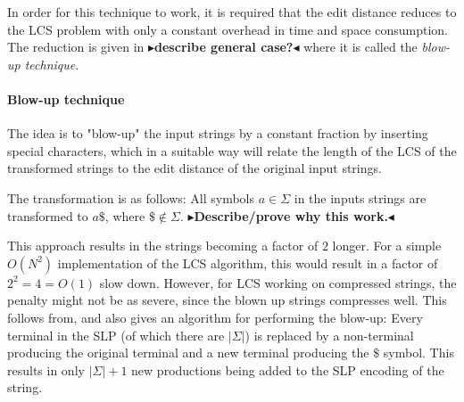 \documentclass[twoside,11pt,openright]{report}
\newcommand{\todo}[1]{{\color[rgb]{.5,0,0}\textbf{$\blacktriangleright$#1$\blacktriangleleft$}}}
\begin{document}
In order for this technique to work, it is required that the edit distance reduces to the LCS problem with only a constant overhead in time and space consumption. The reduction is given in \cite{DBLP:journals/corr/abs-0707-3619} \todo{describe general case?} where it is called the \textit{blow-up technique}.

\paragraph{Blow-up technique}
The idea is to "blow-up" the input strings by a constant fraction by inserting special characters, which in a suitable way will relate the length of the LCS of the transformed strings to the edit distance of the original input strings.

The transformation is as follows: All symbols $a \in \Sigma$ in the inputs strings are transformed to $a\$$, where $\$ \not\in \Sigma$. \todo{Describe/prove why this work.}

This approach results in the strings becoming a factor of $2$ longer. For a simple $O(N^2)$ implementation of the LCS algorithm, this would result in a factor of $2^2 = 4 = O(1)$ slow down. However, for LCS working on compressed strings, the penalty might not be as severe, since the blown up strings compresses well. This follows from, and also gives an algorithm for performing the blow-up: Every terminal in the SLP (of which there are $|\Sigma|$) is replaced by a non-terminal producing the original terminal and a new terminal producing the $\$$ symbol. This results in only $|\Sigma| + 1$ new productions being added to the SLP encoding of the string.
\end{document}
